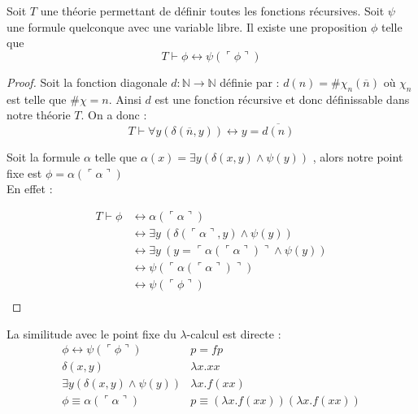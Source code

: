\begin{theoreme}
	Soit $T$ une théorie permettant de définir toutes les fonctions récursives.
	Soit $\psi$ une formule quelconque avec une variable libre. Il existe une proposition $\phi$ telle que
	$$ T \vdash \phi \leftrightarrow \psi (\ulcorner \phi\urcorner ) $$
\end{theoreme}
\begin{proof}
	Soit la fonction diagonale $d : \mathbb{N} \rightarrow \mathbb{N} $ définie par :
	$ d(n)= \# \chi _n(\overline{n})$ où $\chi_n$ est telle que $\# \chi =n$. Ainsi $d$ 
	est une fonction récursive et donc définissable dans notre théorie $T$. On a donc :
	$$T \vdash \forall y (\delta(\overline{n}, y)) \leftrightarrow y=\overline{d(n)} $$

	Soit la formule $\alpha$ telle que $\alpha (x)=\exists y (\delta(x,y) \land \psi(y))$
	, alors notre point fixe est $\phi = \alpha (\ulcorner \alpha \urcorner )$ \\
	En effet :

	\begin{align*}
	 T \vdash \phi & \leftrightarrow \alpha(\ulcorner \alpha \urcorner ) \\
	                 & \leftrightarrow \exists y\ (\delta( \ulcorner \alpha \urcorner , y) \land \psi (y)) \\
	                 & \leftrightarrow \exists y\ (y=\ulcorner \alpha(\ulcorner \alpha  \urcorner)\urcorner \land \psi (y)) \\
	                 & \leftrightarrow \psi (\ulcorner \alpha(\ulcorner \alpha \urcorner)\urcorner)  \\
	                 & \leftrightarrow \psi (\ulcorner \phi \urcorner ) \\
	\end{align*}
\end{proof}


La similitude avec le point fixe du $\lambda$-calcul est directe :
$$
\begin{array}{c|c}
 \phi \leftrightarrow \psi (\ulcorner \phi\urcorner ) & p = fp \\
 \delta(x,y) & \lambda x.xx \\
 \exists y (\delta(x,y) \land \psi(y)) & \lambda x.f (x x) \\
 \phi \equiv \alpha(\ulcorner \alpha \urcorner) & p \equiv (\lambda x.f(xx)) (\lambda x.f(xx)) \\
\end{array}
$$

